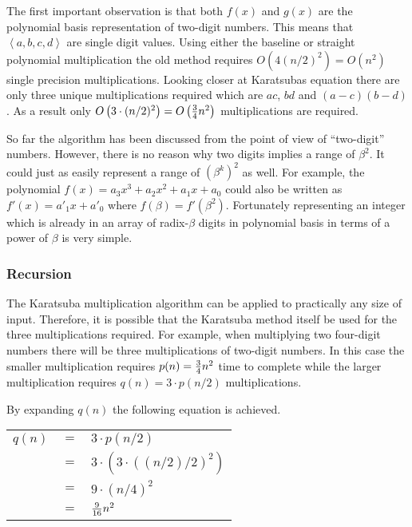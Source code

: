 \documentclass[b5paper]{book}
\begin{document}
The first important observation is that both $f(x)$ and $g(x)$ are the polynomial basis representation of two-digit numbers.  This means that 
$\left < a, b, c, d \right >$ are single digit values.  Using either the baseline or straight polynomial multiplication the old method requires
$O \left (4(n/2)^2 \right ) = O(n^2)$ single precision multiplications.  Looking closer at Karatsubas equation there are only three unique multiplications 
required which are $ac$, $bd$ and $(a - c)(b - d)$.  As a result only $O \left (3 \cdot (n/2)^2 \right ) = O \left ( {3 \over 4}n^2 \right )$ 
multiplications are required.  

So far the algorithm has been discussed from the point of view of ``two-digit'' numbers.  However, there is no reason why two digits implies a range of 
$\beta^2$.  It could just as easily represent a range of $\left (\beta^k \right)^2$ as well.  For example, the polynomial 
$f(x) = a_3x^3 + a_2x^2 + a_1x + a_0$ could also be written as $f'(x) = a'_1x + a'_0$ where $f(\beta) = f'(\beta^2)$.  Fortunately representing an
integer which is already in an array of radix-$\beta$ digits in polynomial basis in terms of a power of $\beta$ is very simple.  

\subsubsection{Recursion}
The Karatsuba multiplication algorithm can be applied to practically any size of input.  Therefore, it is possible that the Karatsuba method itself
be used for the three multiplications required.  For example, when multiplying two four-digit numbers there will be three multiplications of two-digit
numbers.  In this case the smaller multiplication requires $p(n) = {3 \over 4}n^2$ time to complete while the larger multiplication requires
$q(n) = 3 \cdot p(n/2)$ multiplications.  

By expanding $q(n)$ the following equation is achieved. 

\begin{center}
\begin{tabular}{rcl}
$q(n)$ & $=$ & $3 \cdot p(n/2)$ \\
       & $=$ & $3 \cdot (3 \cdot ((n/2)/2)^2)$ \\
       & $=$ & $9 \cdot (n/4)^2$ \\
       & $=$ & ${9 \over 16}n^2$ \\
\end{tabular}
\end{center}
\end{document}
